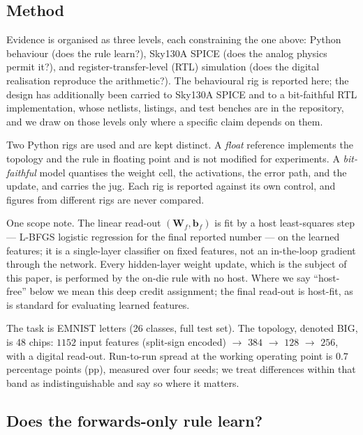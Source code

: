 \documentclass[11pt]{article}
\begin{document}
\hypertarget{method}{%
\subsection{Method}\label{method}}

Evidence is organised as three levels, each constraining the one above:
Python behaviour (does the rule learn?), Sky130A SPICE (does the analog
physics permit it?), and register-transfer-level (RTL) simulation (does
the digital realisation reproduce the arithmetic?). The behavioural rig
is reported here; the design has additionally been carried to Sky130A
SPICE and to a bit-faithful RTL implementation, whose netlists,
listings, and test benches are in the repository, and we draw on those
levels only where a specific claim depends on them.

Two Python rigs are used and are kept distinct. A \emph{float} reference
implements the topology and the rule in floating point and is not
modified for experiments. A \emph{bit-faithful} model quantises the
weight cell, the activations, the error path, and the update, and
carries the jug. Each rig is reported against its own control, and
figures from different rigs are never compared.

One scope note. The linear read-out \((\bm W_f, \bm b_f)\) is fit by a
host least-squares step --- L-BFGS logistic regression for the final
reported number --- on the learned features; it is a single-layer
classifier on fixed features, not an in-the-loop gradient through the
network. Every hidden-layer weight update, which is the subject of this
paper, is performed by the on-die rule with no host. Where we say
``host-free'' below we mean this deep credit assignment; the final
read-out is host-fit, as is standard for evaluating learned features.

The task is EMNIST letters \cite{cohen2017emnist} (26 classes, full
test set). The topology, denoted BIG, is 48 chips: \(1152\) input
features (split-sign encoded) \(\to\) \(384\) \(\to\) \(128\) \(\to\)
\(256\), with a digital read-out. Run-to-run spread at the working
operating point is \(0.7\) percentage points (pp), measured over four
seeds; we treat differences within that band as indistinguishable and
say so where it matters.

\hypertarget{does-the-forwards-only-rule-learn}{%
\subsection{Does the forwards-only rule
learn?}\label{does-the-forwards-only-rule-learn}}
\end{document}
